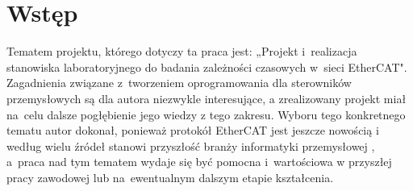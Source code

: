 \section{Wstęp}
Tematem projektu, którego dotyczy ta praca jest: „Projekt i~realizacja stanowiska laboratoryjnego do badania zależności czasowych w~sieci EtherCAT". Zagadnienia związane z~tworzeniem oprogramowania dla sterowników przemysłowych są dla autora niezwykle interesujące, a zrealizowany projekt miał na~celu dalsze pogłębienie jego wiedzy z tego zakresu. Wyboru tego konkretnego tematu autor dokonał, ponieważ protokół EtherCAT jest jeszcze nowością i według wielu źródeł stanowi przyszłość branży informatyki przemysłowej \cite{art1, art2}, a~praca nad tym tematem wydaje się być pomocna i~wartościowa w przyszłej pracy zawodowej lub na~ewentualnym dalszym etapie kształcenia.

